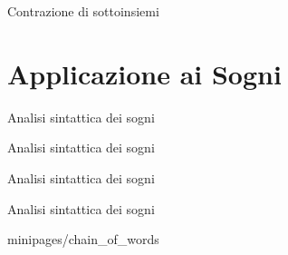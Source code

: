 \documentclass[xcolor=x11names,compress]{beamer}
\begin{document}
\begin{frame}[t]{Contrazione di sottoinsiemi}
    \vspace{-0.5cm}
    
    \begin{minipage}[t]{\textwidth}
        \centering
        
    \end{minipage}
\end{frame}

\section{Applicazione ai Sogni}
\begin{frame}[t]{Analisi sintattica dei sogni}
    \vspace{-0.2cm}
    
\end{frame}

\begin{frame}[t]{Analisi sintattica dei sogni}
    \vspace{-0.2cm}
    
\end{frame}

\begin{frame}[t]{Analisi sintattica dei sogni}
    \vspace{-0.2cm}
    
\end{frame}

\begin{frame}[t]{Analisi sintattica dei sogni}
    \vspace{-0.2cm}
    
    
     {minipages/chain_of_words}
\end{frame}
\end{document}
